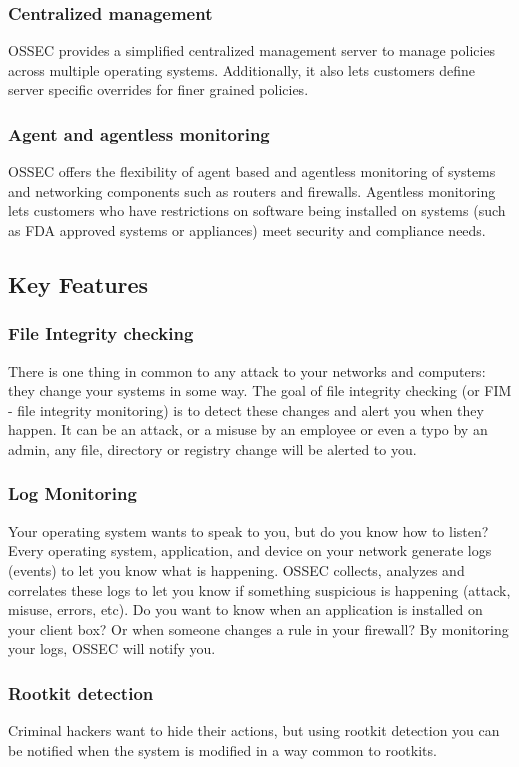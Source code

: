 \documentclass{article}
\begin{document}
\subsubsection{Centralized management}
OSSEC provides a simplified centralized management server to manage policies across multiple operating systems. Additionally, it also lets customers define server specific overrides for finer grained policies.
\subsubsection{Agent and agentless monitoring}
OSSEC offers the flexibility of agent based and agentless monitoring of systems and networking components such as routers and firewalls. Agentless monitoring lets customers who have restrictions on software being installed on systems (such as FDA approved systems or appliances) meet security and compliance needs.
\subsection{Key Features}
\subsubsection{File Integrity checking}
There is one thing in common to any attack to your networks and computers: they change your systems in some way. The goal of file integrity checking (or FIM - file integrity monitoring) is to detect these changes and alert you when they happen. It can be an attack, or a misuse by an employee or even a typo by an admin, any file, directory or registry change will be alerted to you.
\subsubsection{Log Monitoring}
Your operating system wants to speak to you, but do you know how to listen? Every operating system, application, and device on your network generate logs (events) to let you know what is happening. OSSEC collects, analyzes and correlates these logs to let you know if something suspicious is happening (attack, misuse, errors, etc). Do you want to know when an application is installed on your client box? Or when someone changes a rule in your firewall? By monitoring your logs, OSSEC will notify you.
\subsubsection{Rootkit detection}
Criminal hackers want to hide their actions, but using rootkit detection you can be notified when the system is modified in a way common to rootkits.
\end{document}
